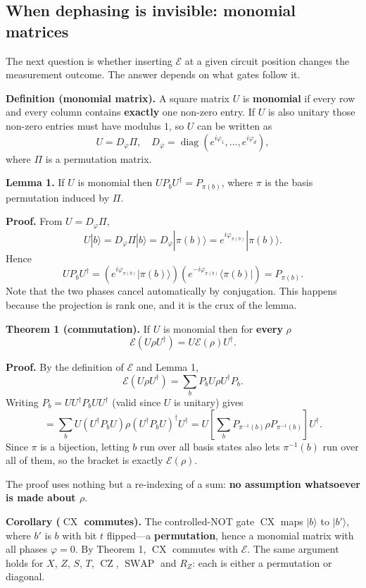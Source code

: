 \documentclass{article}
\begin{document}
\subsection{When dephasing is invisible: monomial matrices}

The next question is whether inserting \(\mathcal{E}\) at a given
circuit position changes the measurement outcome. The answer depends on
what gates follow it.

\textbf{Definition (monomial matrix).} A square matrix \(U\) is
\textbf{monomial} if every row and every column contains
\textbf{exactly} one non-zero entry. If \(U\) is also unitary those
non-zero entries must have modulus \(1\), so \(U\) can be written as
\[U = D_{\varphi}\Pi,\quad D_{\varphi} = \operatorname{diag}(e^{i\varphi_{1}},\ldots,e^{i\varphi_{d}}),\]
where \(\Pi\) is a permutation matrix.

\textbf{Lemma 1.} If \(U\) is monomial then
\(UP_{b}U^{\dagger} = P_{\pi(b)}\), where \(\pi\) is the basis
permutation induced by \(\Pi\).

\textbf{Proof.} From \(U = D_{\varphi}\Pi\),
\[U|b\rangle = D_{\varphi}\Pi|b\rangle = D_{\varphi}|\pi(b)\rangle = e^{i\varphi_{\pi(b)}}|\pi(b)\rangle.\]
Hence
\[UP_{b}U^{\dagger} = \left( e^{i\varphi_{\pi(b)}}|\pi(b)\rangle \right)\left( e^{- i\varphi_{\pi(b)}}\langle\pi(b)| \right) = P_{\pi(b)}.\]
Note that the two phases cancel automatically by conjugation. This
happens because the projection is rank one, and it is the crux of the
lemma.

\textbf{Theorem 1 (commutation).} If \(U\) is monomial then for
\textbf{every} \(\rho\)
\[\mathcal{E}(U\rho U^{\dagger}) = U\mathcal{E}(\rho)U^{\dagger}.\]

\textbf{Proof.} By the definition of \(\mathcal{E}\) and Lemma 1,
\[\mathcal{E}(U\rho U^{\dagger}) = \sum_{b}P_{b}U\rho U^{\dagger}P_{b}.\]
Writing \(P_{b} = UU^{\dagger}P_{b}UU^{\dagger}\) (valid since \(U\) is
unitary) gives
\[= \sum_{b}U\left( U^{\dagger}P_{b}U \right)\rho\left( U^{\dagger}P_{b}U \right)^{\dagger}U^{\dagger} = U\left\lbrack \sum_{b}P_{\pi^{- 1}(b)}\rho P_{\pi^{- 1}(b)} \right\rbrack U^{\dagger}.\]
Since \(\pi\) is a bijection, letting \(b\) run over all basis states
also lets \(\pi^{- 1}(b)\) run over all of them, so the bracket is
exactly \(\mathcal{E}(\rho)\).

The proof uses nothing but a re-indexing of a sum: \textbf{no assumption
whatsoever is made about \(\rho\)}.

\textbf{Corollary (\(\operatorname{CX}\) commutes).} The controlled-NOT
gate \(\operatorname{CX}\) maps \(|b\rangle\) to \(|b'\rangle\), where
\(b'\) is \(b\) with bit \(t\) flipped---a \textbf{permutation}, hence a
monomial matrix with all phases \(\varphi = 0\). By Theorem 1,
\(\operatorname{CX}\) commutes with \(\mathcal{E}\). The same argument
holds for \(X\), \(Z\), \(S\), \(T\), \(\operatorname{CZ}\),
\(\operatorname{SWAP}\) and \(R_{Z}\): each is either a permutation or
diagonal.
\end{document}
